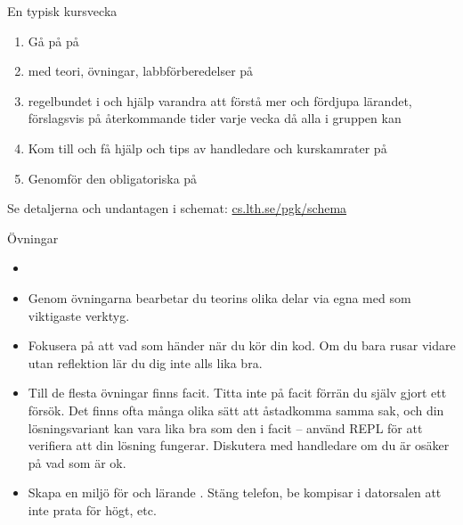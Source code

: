 \fi %

\begin{Slide}{En typisk kursvecka}
\begin{enumerate}
\item Gå på  på 
\item {}  med teori, övningar, labbförberedelser på  
\item {} regelbundet i  och hjälp varandra att förstå mer och fördjupa lärandet, förslagsvis på återkommande tider varje vecka då alla i gruppen kan
\item Kom till  och få hjälp och tips av handledare och kurskamrater på 
\item Genomför den obligatoriska  på 
\end{enumerate}
Se detaljerna och undantagen i schemat: \href{http://cs.lth.se/pgk/schema}{cs.lth.se/pgk/schema}
\end{Slide}

\ifkompendium\else  %
\begin{SlideExtra}{Övningar}\SlideFontSmall
\begin{itemize}
  \item {}

\item Genom övningarna bearbetar du teorins olika delar via egna  med  som viktigaste verktyg.

\item Fokusera på att  vad som händer när du kör din kod. Om du bara rusar vidare utan reflektion lär du dig inte alls lika bra.

\item Till de flesta övningar finns facit. Titta inte på facit förrän du själv gjort ett försök. Det finns ofta många olika sätt att åstadkomma samma sak, och din lösningsvariant kan vara lika bra som den i facit -- använd REPL för att verifiera att din lösning fungerar. Diskutera med handledare om du är osäker på vad som är ok.

\item Skapa en miljö för  och lärande . Stäng telefon, be kompisar i datorsalen att inte prata för högt, etc.
\end{itemize}
\end{SlideExtra}

